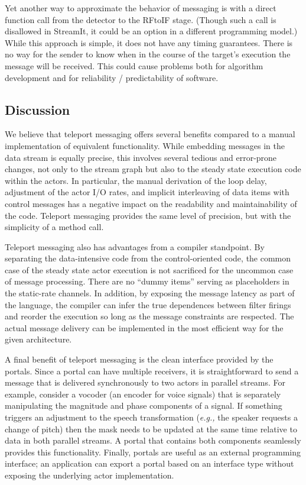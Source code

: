 Yet another way to approximate the behavior of messaging is with a
direct function call from the detector to the RFtoIF stage.  (Though
such a call is disallowed in StreamIt, it could be an option in a
different programming model.)  While this approach is simple, it does
not have any timing guarantees.  There is no way for the sender to
know when in the course of the target's execution the message will be
received.  This could cause problems both for algorithm development
and for reliability / predictability of software.

\vspace{12pt}
\subsection{Discussion}

We believe that teleport messaging offers several benefits compared to
a manual implementation of equivalent functionality.  While embedding
messages in the data stream is equally precise, this involves several
tedious and error-prone changes, not only to the stream graph but also
to the steady state execution code within the actors.  In particular,
the manual derivation of the loop delay, adjustment of the actor I/O
rates, and implicit interleaving of data items with control messages
has a negative impact on the readability and maintainability of the
code.  Teleport messaging provides the same level of precision, but
with the simplicity of a method call.

Teleport messaging also has advantages from a compiler standpoint.  By
separating the data-intensive code from the control-oriented code, the
common case of the steady state actor execution is not sacrificed for
the uncommon case of message processing.  There are no ``dummy items''
serving as placeholders in the static-rate channels.  In addition, by
exposing the message latency as part of the language, the compiler can
infer the true dependences between filter firings and reorder the
execution so long as the message constraints are respected.  The
actual message delivery can be implemented in the most efficient way
for the given architecture.

A final benefit of teleport messaging is the clean interface provided
by the portals.  Since a portal can have multiple receivers, it is
straightforward to send a message that is delivered synchronously to
two actors in parallel streams.  For example, consider a vocoder (an
encoder for voice signals) that is separately manipulating the
magnitude and phase components of a signal.  If something triggers an
adjustment to the speech transformation ({\it e.g.,} the speaker
requests a change of pitch) then the mask needs to be updated at the
same time relative to data in both parallel streams.  A portal that
contains both components seamlessly provides this functionality.
Finally, portals are useful as an external programming interface; an
application can export a portal based on an interface type without
exposing the underlying actor implementation.


